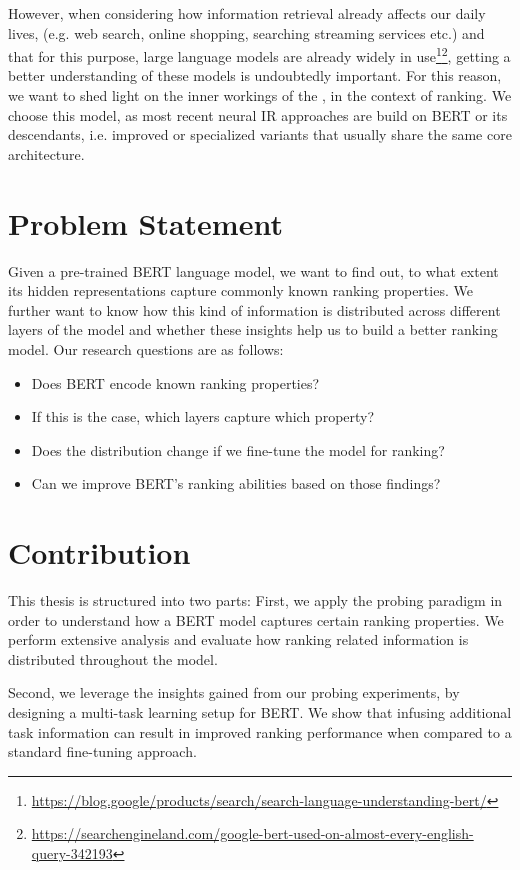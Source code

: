 However, when considering how information retrieval already affects our daily lives, (e.g. web search, online shopping, searching streaming services etc.) and that for this purpose, large language models are already widely in use\footnote{\url{https://blog.google/products/search/search-language-understanding-bert/}}\footnote{\url{https://searchengineland.com/google-bert-used-on-almost-every-english-query-342193}}, getting a better understanding of these models is undoubtedly important. For this reason, we want to shed light on the inner workings of the \cite{devlin-etal-2019-bert}, in the context of ranking. We choose this model, as most recent neural IR approaches are build on BERT or its descendants, i.e. improved or specialized variants that usually share the same core architecture.

\section{Problem Statement}
Given a pre-trained BERT language model, we want to find out, to what extent its hidden representations capture commonly known ranking properties. We further want to know how this kind of information is distributed across different layers of the model and whether these insights help us to build a better ranking model. Our research questions are as follows:
\begin{itemize}
    \item Does BERT encode known ranking properties?
    \item If this is the case, which layers capture which property?
    \item Does the distribution change if we fine-tune the model for ranking?
    \item Can we improve BERT's ranking abilities based on those findings?
\end{itemize}

\section{Contribution}
This thesis is structured into two parts: First, we apply the probing paradigm in order to understand how a BERT model captures certain ranking properties. We perform extensive analysis and evaluate how ranking related information is distributed throughout the model.

Second, we leverage the insights gained from our probing experiments, by designing a multi-task learning setup for BERT. We show that infusing additional task information can result in improved ranking performance when compared to a standard fine-tuning approach.


